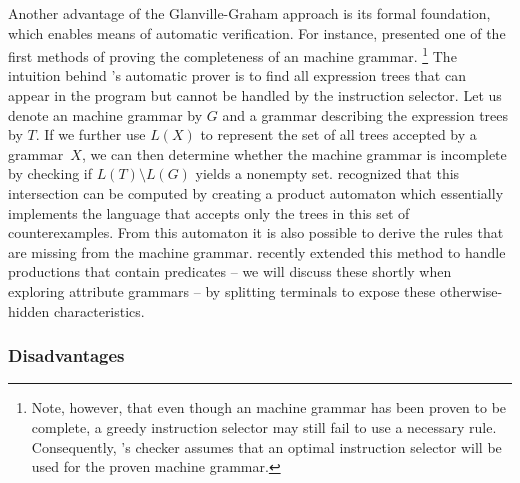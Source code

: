 Another advantage of the \gls{Glanville-Graham approach} is its formal
foundation, which enables means of automatic verification.
%
For instance, \textcite{Emmelmann:1992:Testing} presented one of the first
methods of proving the completeness of an \gls{machine grammar}.\!%
%
\footnote{%
  Note, however, that even though an \gls{machine grammar} has been proven to be
  complete, a greedy \gls{instruction selector} may still fail to use a
  necessary \gls{rule}.
  Consequently, \citeauthor{Emmelmann:1992:Testing}'s checker assumes that an
  optimal \gls{instruction selector} will be used for the proven \gls{machine
    grammar}.%
}
%
The intuition behind \citeauthor{Emmelmann:1992:Testing}'s automatic prover is
to find all \glspl{expression tree} that can appear in the \gls{program} but
cannot be handled by the \gls{instruction selector}.
%
Let us denote an \gls{machine grammar} by $G$ and a \gls{grammar} describing the
\glspl{expression tree} by $T$.
%
If we further use $L(X)$ to represent the set of all \glspl{tree} accepted by a
\gls{grammar}~$X$, we can then determine whether the \gls{machine grammar} is
incomplete by checking if $L(T) \setminus L(G)$ yields a nonempty set.
%
\citeauthor{Emmelmann:1992:Testing} recognized that this intersection can be
computed by creating a \gls{product automaton} which essentially implements the
language that accepts only the \glspl{tree} in this set of counterexamples.
%
From this automaton it is also possible to derive the \glspl{rule} that are
missing from the \gls{machine grammar}.
%
\textcite{BrandnerEtAl:2010} recently extended this method to handle
\glspl{production} that contain \glspl{predicate} -- we will discuss these
shortly when exploring \glspl{attribute grammar} -- by splitting
\glspl{terminal} to expose these otherwise-hidden characteristics.


\subsubsection{Disadvantages}


